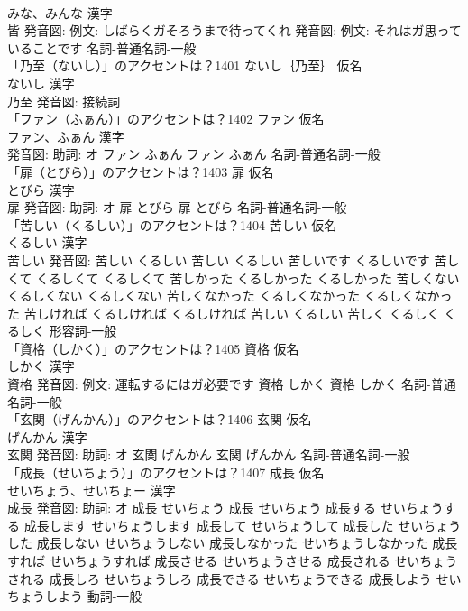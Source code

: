 \documentclass[8pt]{extreport}
\begin{document}
\begin{CJK}{UTF8}{min}
\\	みな、みんな 漢字　
\\	皆 発音図: 例文: しばらくガそろうまで待ってくれ 発音図: 例文: それはガ思っていることです							名詞-普通名詞-一般 
\\	「乃至（ないし）」のアクセントは？1401	ないし｛乃至｝ 仮名　
\\	ないし 漢字　
\\	乃至 発音図:							接続詞 
\\	「ファン（ふぁん）」のアクセントは？1402	ファン 仮名　
\\	ファン、ふぁん 漢字　
\\	発音図: 助詞: オ	ファン ふぁん		ファン ふぁん				名詞-普通名詞-一般 
\\	「扉（とびら）」のアクセントは？1403	扉 仮名　
\\	とびら 漢字　
\\	扉 発音図: 助詞: オ	扉 とびら		扉 とびら				名詞-普通名詞-一般 
\\	「苦しい（くるしい）」のアクセントは？1404	苦しい 仮名　
\\	くるしい 漢字　
\\	苦しい 発音図:	苦しい くるしい		苦しい くるしい 苦しいです くるしいです 苦しくて くるしくて くるしくて 苦しかった くるしかった くるしかった 苦しくない くるしくない くるしくない 苦しくなかった くるしくなかった くるしくなかった 苦しければ くるしければ くるしければ 苦しい くるしい 苦しく くるしく くるしく				形容詞-一般 
\\	「資格（しかく）」のアクセントは？1405	資格 仮名　
\\	しかく 漢字　
\\	資格 発音図: 例文: 運転するにはガ必要です	資格 しかく		資格 しかく				名詞-普通名詞-一般 
\\	「玄関（げんかん）」のアクセントは？1406	玄関 仮名　
\\	げんかん 漢字　
\\	玄関 発音図: 助詞: オ	玄関 げんかん		玄関 げんかん				名詞-普通名詞-一般 
\\	「成長（せいちょう）」のアクセントは？1407	成長 仮名　
\\	せいちょう、せいちょー 漢字　
\\	成長 発音図: 助詞: オ	成長 せいちょう		成長 せいちょう 成長する せいちょうする 成長します せいちょうします 成長して せいちょうして 成長した せいちょうした 成長しない せいちょうしない 成長しなかった せいちょうしなかった 成長すれば せいちょうすれば 成長させる せいちょうさせる 成長される せいちょうされる 成長しろ せいちょうしろ 成長できる せいちょうできる 成長しよう せいちょうしよう				動詞-一般 

\end{CJK}
\end{document}
